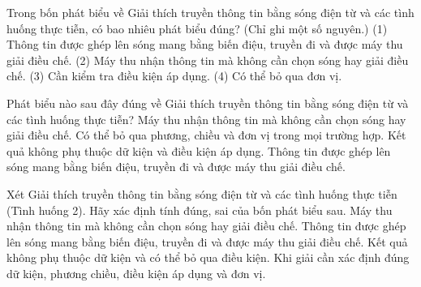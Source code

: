 \begin{ex}
Trong bốn phát biểu về Giải thích truyền thông tin bằng sóng điện từ và các tình huống thực tiễn, có bao nhiêu phát biểu đúng? (Chỉ ghi một số nguyên.) (1) Thông tin được ghép lên sóng mang bằng biến điệu, truyền đi và được máy thu giải điều chế. (2) Máy thu nhận thông tin mà không cần chọn sóng hay giải điều chế. (3) Cần kiểm tra điều kiện áp dụng. (4) Có thể bỏ qua đơn vị.
\end{ex}

\begin{ex}
Phát biểu nào sau đây đúng về Giải thích truyền thông tin bằng sóng điện từ và các tình huống thực tiễn?
\choice
{Máy thu nhận thông tin mà không cần chọn sóng hay giải điều chế.}
{Có thể bỏ qua phương, chiều và đơn vị trong mọi trường hợp.}
{Kết quả không phụ thuộc dữ kiện và điều kiện áp dụng.}
{\True Thông tin được ghép lên sóng mang bằng biến điệu, truyền đi và được máy thu giải điều chế.}
\end{ex}

\begin{ex}
Xét Giải thích truyền thông tin bằng sóng điện từ và các tình huống thực tiễn (Tình huống 2). Hãy xác định tính đúng, sai của bốn phát biểu sau.
\choiceTF
{Máy thu nhận thông tin mà không cần chọn sóng hay giải điều chế.}
{\True Thông tin được ghép lên sóng mang bằng biến điệu, truyền đi và được máy thu giải điều chế.}
{Kết quả không phụ thuộc dữ kiện và có thể bỏ qua điều kiện.}
{\True Khi giải cần xác định đúng dữ kiện, phương chiều, điều kiện áp dụng và đơn vị.}
\end{ex}


